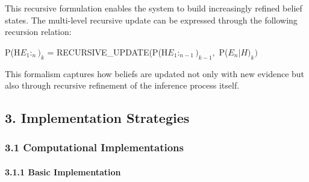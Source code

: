 \documentclass[
]{article}
\begin{document}
This recursive formulation enables the system to build increasingly
refined belief states. The multi-level recursive update can be expressed
through the following recursion relation:

P(H\textbar{}\(E_{1}:_{n})_{k}\) =
RECURSIVE\_UPDATE(P(H\textbar{}\(E_{1}:_{n-1})_{k-1},\)
P(\(E_{n}|H)_{k})\)

This formalism captures how beliefs are updated not only with new
evidence but also through recursive refinement of the inference process
itself.

\subsection{3. Implementation
Strategies}\label{implementation-strategies-1}

\subsubsection{3.1 Computational
Implementations}\label{computational-implementations-1}

\paragraph{3.1.1 Basic Implementation}\label{basic-implementation-1}
\end{document}
